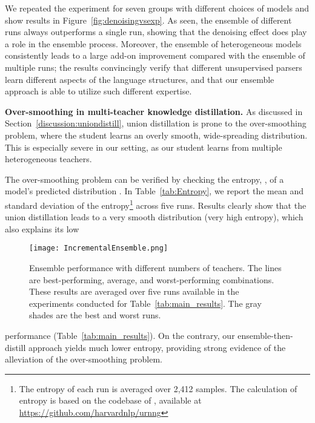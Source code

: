 \documentclass{article}
\begin{document}
We repeated the experiment for seven groups with different choices of models and show results in Figure~\ref{fig:denoisingvsexp}. As seen, the ensemble of different runs always outperforms a single run, showing that the denoising effect does play a role in the ensemble process. Moreover, the ensemble of heterogeneous models consistently leads to a large add-on improvement compared with the ensemble of multiple runs; the results convincingly verify that different unsupervised parsers learn different aspects of the language structures, and that our ensemble approach is able to utilize such different expertise.


\textbf{Over-smoothing in multi-teacher knowledge distillation.} As discussed in Section~\ref{discussion:uniondistill}, union distillation is prone to the over-smoothing problem, where the student learns an overly smooth, wide-spreading distribution. This is especially severe in our setting, as our student learns from multiple heterogeneous teachers. 

\begin{table}[t]
\centering
{}
\vspace{5pt}
\caption{The mean and standard deviation (std) of the prediction entropy for distilled RNNGs.}
\label{tab:Entropy}
\end{table}

The over-smoothing problem can be verified by checking the entropy, , of a model's predicted distribution . In Table~\ref{tab:Entropy}, we report the mean and standard deviation of the entropy\footnote{The entropy of each run is averaged over 2,412 samples. The calculation of entropy is based on the codebase of \citet{kim-etal-2019-unsupervised}, available at \url{https://github.com/harvardnlp/urnng}} across five runs. Results clearly show that the union distillation leads to a very smooth distribution (very high entropy), which also explains its low 
\begin{wrapfigure}{r}{0.45\textwidth}
    \texttt{[image: IncrementalEnsemble.png]}
    \caption{Ensemble performance with different numbers of teachers. The lines are best-performing, average, and worst-performing combinations. These results are averaged over five runs available in the experiments conducted for Table~\ref{tab:main_results}. The gray shades are the best and worst runs.}
    \label{fig:teachercount}\vspace{-.5cm}
\end{wrapfigure}
performance (Table~\ref{tab:main_results}). On the contrary, our ensemble-then-distill approach yields much lower entropy, providing strong evidence of the alleviation of the over-smoothing problem.
\end{document}

